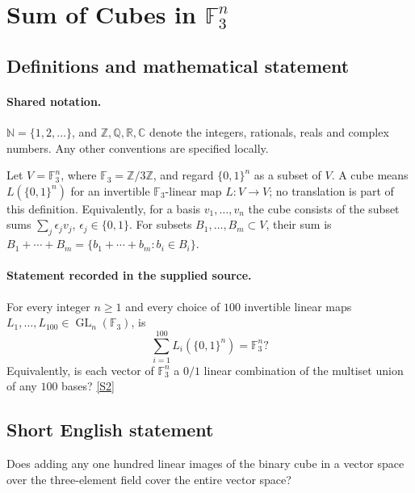 \documentclass[11pt]{article}
\newcommand{\sref}[2]{\hyperlink{source:#1:#2}{[S#2]}}
\begin{document}
\section{Sum of Cubes in $\mathbb F_3^n$}\label{statement}

\subsection{Definitions and mathematical statement}

\paragraph{Shared notation.}$\mathbb N=\{1,2,\ldots\}$, and $\mathbb Z,\mathbb Q,\mathbb R,\mathbb C$ denote the integers, rationals, reals and complex numbers. Any other conventions are specified locally.


Let $V=\mathbb F_3^n$, where $\mathbb F_3=\mathbb Z/3\mathbb Z$, and regard $\{0,1\}^n$ as a subset of $V$. A cube means $L(\{0,1\}^n)$ for an invertible $\mathbb F_3$-linear map $L:V\to V$; no translation is part of this definition. Equivalently, for a basis $v_1,\ldots,v_n$ the cube consists of the subset sums $\sum_j\epsilon_jv_j$, $\epsilon_j\in\{0,1\}$. For subsets $B_1,\ldots,B_m\subset V$, their sum is $B_1+\cdots+B_m=\{b_1+\cdots+b_m:b_i\in B_i\}$.
\paragraph{Statement recorded in the supplied source.}
For every integer $n\geq1$ and every choice of $100$ invertible linear maps $L_1,\ldots,L_{100}\in\operatorname{GL}_n(\mathbb F_3)$, is
\[
 \sum_{i=1}^{100}L_i(\{0,1\}^n)=\mathbb F_3^n?
\]
Equivalently, is each vector of $\mathbb F_3^n$ a $0/1$ linear combination of the multiset union of any $100$ bases? \sref{statement}{2}
\subsection{Short English statement}
Does adding any one hundred linear images of the binary cube in a vector space over the three-element field cover the entire vector space?
\end{document}
